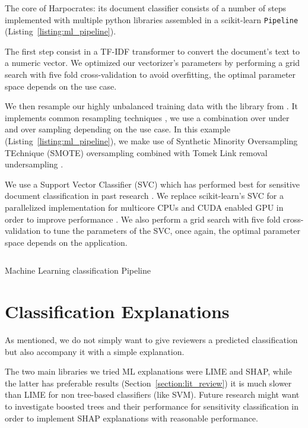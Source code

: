 \documentclass[\version]{l4proj}
\begin{document}
The core of Harpocrates: its document classifier consists of a number of steps implemented with multiple python libraries assembled in a scikit-learn \verb|Pipeline| (Listing~\ref{listing:ml_pipeline}).

The first step consist in a TF-IDF transformer to convert the document's text to a numeric vector.
We optimized our vectorizer's parameters by performing a grid search with five fold cross-validation to avoid overfitting, the optimal parameter space depends on the use case.

We then resample our highly unbalanced training data with the \textcite{ScikitlearncontribImbalancedlearn2020} library from \textcite{lemaitreImbalancedlearnPythonToolbox2017}.
It implements common resampling techniques \autocite{lemaitreImbalancedlearnPythonToolbox2017}, we use a combination over under and over sampling depending on the use case.
In this example (Listing~\ref{listing:ml_pipeline}), we make use of Synthetic Minority Oversampling TEchnique (SMOTE) oversampling combined with Tomek Link removal undersampling \autocite{batistaStudyBehaviorSeveral2004}.

We use a Support Vector Classifier (SVC) which has performed best for sensitive document classification in past research \autocite{mcdonaldClassifierDigitalSensitivity2014,mcdonaldStudySVMKernel2017}.
We replace scikit-learn's SVC for a parallelized implementation for multicore CPUs and CUDA enabled GPU in order to improve performance \autocite{wenThunderSVMFastSVM2018}.
We also perform a grid search with five fold cross-validation to tune the parameters of the SVC, once again, the optimal parameter space depends on the application.

\begin{listing}[H]
    \inputminted{python}{code/ml_pipeline.py}
    \caption{Machine Learning classification Pipeline}\label{listing:ml_pipeline}
\end{listing}

\section{Classification Explanations}

As mentioned, we do not simply want to give reviewers a predicted classification but also accompany it with a simple explanation.

The two main libraries we tried ML explanations were LIME and SHAP, while the latter has preferable results (Section~\ref{section:lit_review}) it is much slower than LIME for non tree-based classifiers (like SVM).
Future research might want to investigate boosted trees \autocite{chenXGBoostScalableTree2016} and their performance for sensitivity classification in order to implement SHAP explanations with reasonable performance.
\end{document}

